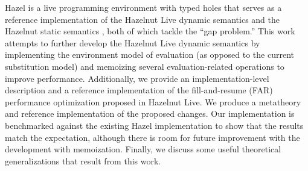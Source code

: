 
\noindent{}Hazel is a live programming environment with typed holes that serves as a reference implementation of the Hazelnut Live dynamic semantics \cite{conf/popl/Hazelnut17} and the Hazelnut static semantics \cite{conf/popl/HazelnutLive19}, both of which tackle the ``gap problem.'' This work attempts to further develop the Hazelnut Live dynamic semantics by implementing the environment model of evaluation (as opposed to the current substitution model) and memoizing several evaluation-related operations to improve performance. Additionally, we provide an implementation-level description and a reference implementation of the fill-and-resume (FAR) performance optimization proposed in Hazelnut Live. We produce a metatheory and reference implementation of the proposed changes. Our implementation is benchmarked against the existing Hazel implementation to show that the results match the expectation, although there is room for future improvement with the development with memoization. Finally, we discuss some useful theoretical generalizations that result from this work.


